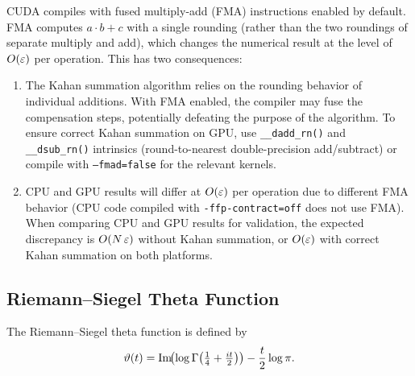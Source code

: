 \begin{remark}\label{rem:fma}
CUDA compiles with fused multiply-add (FMA) instructions enabled by default. FMA
computes $a \cdot b + c$ with a single rounding (rather than the two roundings of
separate multiply and add), which changes the numerical result at the level of
$O(\varepsilon)$ per operation. This has two consequences:
\begin{enumerate}
  \item The Kahan summation algorithm relies on the rounding behavior of individual
        additions. With FMA enabled, the compiler may fuse the compensation steps,
        potentially defeating the purpose of the algorithm. To ensure correct Kahan
        summation on GPU, use \texttt{\_\_dadd\_rn()} and \texttt{\_\_dsub\_rn()}
        intrinsics (round-to-nearest double-precision add/subtract) or compile with
        \texttt{--fmad=false} for the relevant kernels.
  \item CPU and GPU results will differ at $O(\varepsilon)$ per operation due to different FMA
        behavior (CPU code compiled with \texttt{-ffp-contract=off} does not use FMA).
        When comparing CPU and GPU results for validation, the expected discrepancy is
        $O(N\,\varepsilon)$ without Kahan summation, or $O(\varepsilon)$ with correct Kahan summation
        on both platforms.
\end{enumerate}
\end{remark}


\subsection{Riemann--Siegel Theta Function}
\label{sec:theta}

The Riemann--Siegel theta function is defined by
\begin{equation}\label{eq:theta-def}
  \vartheta(t) = \operatorname{Im}\!\bigl(\log\Gamma\bigl(\tfrac{1}{4} + \tfrac{it}{2}\bigr)\bigr)
  - \frac{t}{2}\log\pi.
\end{equation}


